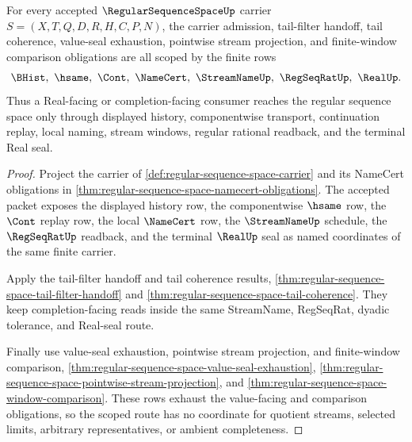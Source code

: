 \begin{theorem}
\label{thm:regular-sequence-space-obligation-scope-route}
For every accepted $\RegularSequenceSpaceUp$ carrier $S=(X,T,Q,D,R,H,C,P,N)$, the carrier admission, tail-filter handoff, tail coherence, value-seal exhaustion, pointwise stream projection, and finite-window comparison obligations are all scoped by the finite rows
$$
\BHist,\ \hsame,\ \Cont,\ \NameCert,\ \StreamNameUp,\ \RegSeqRatUp,\ \RealUp .
$$
Thus a Real-facing or completion-facing consumer reaches the regular sequence space only through displayed history, componentwise transport, continuation replay, local naming, stream windows, regular rational readback, and the terminal Real seal.
\end{theorem}
\begin{proof}
Project the carrier of \autoref{def:regular-sequence-space-carrier} and its NameCert obligations in \autoref{thm:regular-sequence-space-namecert-obligations}. The accepted packet exposes the displayed history row, the componentwise $\hsame$ row, the $\Cont$ replay row, the local $\NameCert$ row, the $\StreamNameUp$ schedule, the $\RegSeqRatUp$ readback, and the terminal $\RealUp$ seal as named coordinates of the same finite carrier.

Apply the tail-filter handoff and tail coherence results, \autoref{thm:regular-sequence-space-tail-filter-handoff} and \autoref{thm:regular-sequence-space-tail-coherence}. They keep completion-facing reads inside the same StreamName, RegSeqRat, dyadic tolerance, and Real-seal route.

Finally use value-seal exhaustion, pointwise stream projection, and finite-window comparison, \autoref{thm:regular-sequence-space-value-seal-exhaustion}, \autoref{thm:regular-sequence-space-pointwise-stream-projection}, and \autoref{thm:regular-sequence-space-window-comparison}. These rows exhaust the value-facing and comparison obligations, so the scoped route has no coordinate for quotient streams, selected limits, arbitrary representatives, or ambient completeness.
\end{proof}

